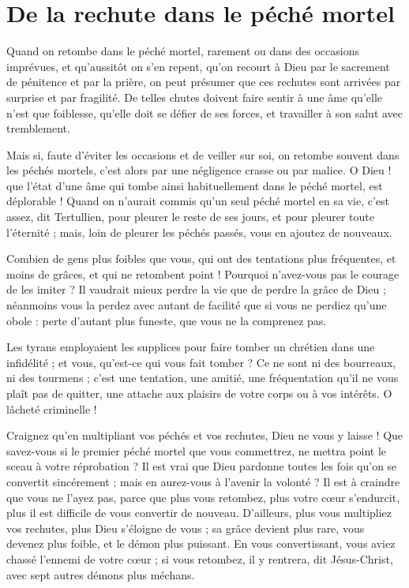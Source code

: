 \documentclass[instructions.tex]{subfiles}
\begin{document}
 
\chapter{De la rechute dans le péché mortel}
 
\primo Quand on retombe dans le péché mortel, rarement ou dans des occasions imprévues, et qu’aussitôt on s’en repent, qu’on recourt à Dieu par le sacrement de pénitence et par la prière, on peut présumer que ces rechutes sont arrivées par surprise et par fragilité. De telles chutes doivent faire sentir à une âme qu’elle n’est que foiblesse, qu’elle doit se défier de ses forces, et travailler à son salut avec tremblement.
 
Mais si, faute d’éviter les occasions et de veiller sur soi, on retombe souvent dans les péchés mortels, c’est alors par une négligence crasse ou par malice. O Dieu ! que l’état d’une âme qui tombe ainsi habituellement dans le péché mortel, est déplorable ! Quand on n’aurait commis qu’un seul péché mortel en sa vie, c’est assez, dit Tertullien, pour pleurer le reste de ses jours, et pour pleurer toute l’éternité ; mais, loin de pleurer les péchés passés, vous en ajoutez de nouveaux.
 
Combien de gens plus foibles que vous, qui ont des tentations plus fréquentes, et moins de grâces, et qui ne retombent point ! Pourquoi n’avez-vous pas le courage de les imiter ? Il vaudrait mieux perdre la vie que de perdre la grâce de Dieu ; néanmoins vous la perdez avec autant de facilité que si vous ne perdiez qu’une obole : perte d’autant plus funeste, que vous ne la comprenez pas.
 
Les tyrans employaient les supplices pour faire tomber un chrétien dans une infidélité ; et vous, qu’est-ce qui vous fait tomber ? Ce ne sont ni des bourreaux, ni des tourmens ; c’est une tentation, une amitié, une fréquentation qu’il ne vous plaît pas de quitter, une attache aux plaisirs de votre corps ou à vos intérêts. O lâcheté criminelle !
 
\secundo Craignez qu’en multipliant vos péchés et vos rechutes, Dieu ne vous y laisse ! Que savez-vous si le premier péché mortel que vous commettrez, ne mettra point le sceau à votre réprobation ? Il est vrai que Dieu pardonne toutes les fois qu’on se convertit sincérement ; mais en aurez-vous à l’avenir la volonté ? Il est à craindre que vous ne l’ayez pas, parce que plus vous retombez, plus votre cœur s’endurcit, plus il est difficile de vous convertir de nouveau. D’ailleurs, plus vous multipliez vos rechutes, plus Dieu s’éloigne de vous ; sa grâce devient plus rare, vous devenez plus foible, et le démon plus puissant. En vous convertissant, vous aviez chassé l’ennemi de votre cœur ; si vous retombez, il y rentrera, dit Jésus-Christ, avec sept autres démons plus méchans.
 
\end{document}
